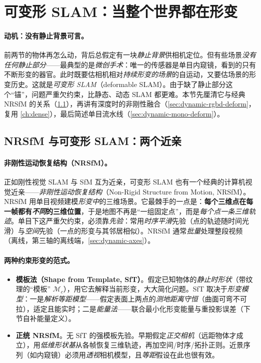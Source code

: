 \section{可变形 SLAM：当整个世界都在形变}
\label{sec:dynamic-deformable}

\paragraph{动机：没有静止背景可言。}
前两节的物体再怎么动，背后总假定有一块\emph{静止背景}供相机定位。但有些场景\emph{没有任何静止部分}——最典型的是\emph{微创手术}：唯一的传感器是单目内窥镜，看到的只有不断形变的器官\cite{schmid2026dynamic}。此时既要估相机相对\emph{持续形变的场景}的自运动，又要估场景的形变历史。这就是\emph{可变形 SLAM}（deformable SLAM）。由于缺了静止部分这个“锚”，问题严重欠约束，比静态、动态 SLAM 都更难。本节先厘清它与经典 NRSfM 的关系（\cref{sec:dynamic-nrsfm}），再讲有深度时的非刚性融合（\cref{sec:dynamic-rgbd-deform}，复用 \cref{ch:dense}），最后简述单目流水线（\cref{sec:dynamic-mono-deform}）。

\subsection{NRSfM 与可变形 SLAM：两个近亲}
\label{sec:dynamic-nrsfm}

\paragraph{非刚性运动恢复结构（NRSfM）。}
正如刚性视觉 SLAM 与 SfM 互为近亲，可变形 SLAM 也有一个经典的计算机视觉近亲——\emph{非刚性运动恢复结构}（Non-Rigid Structure from Motion, NRSfM）\cite{schmid2026dynamic}。NRSfM 用单目视频建模\emph{形变中}的三维场景。它最棘手的一点是：\textbf{每个三维点在每一帧都有\emph{不同}的三维位置}，于是地图不再是“一组固定点”，而是\emph{每个点一条三维轨迹}。单目下这严重欠约束，必须靠\emph{先验}：常用\emph{时序平滑}先验（点的轨迹随时间光滑）与\emph{空间}先验（一点的形变与其邻居相似）。NRSfM 通常\emph{批量}处理整段视频（离线，第三轴的离线端，\cref{sec:dynamic-axes}）。

\paragraph{两种约束形变的范式。}
\begin{itemize}
  \item \textbf{模板法（Shape from Template, SfT）}。假定已知物体的\emph{静止时形状}（带纹理的“模板” $\mathcal{M}_c$），用它去解释当前形变，大大简化问题。SfT 取决于\emph{形变模型}：一是\emph{解析等距模型}——假定表面上两点的\emph{测地距离守恒}（曲面可弯不可拉），适定且能实时；二是\emph{能量法}——联合最小化形变能量与重投影误差（下节自补能量定义）。
  \item \textbf{正统 NRSfM}。无 SfT 的强模板先验。早期假定\emph{正交相机}（远距物体才成立），用\emph{低维形状基}从各帧恢复三维轨迹，再加空间/时序/拓扑正则。近景序列（如内窥镜）必须用\emph{透视}相机模型，且\emph{等距}假设在此也很有效。
\end{itemize}

